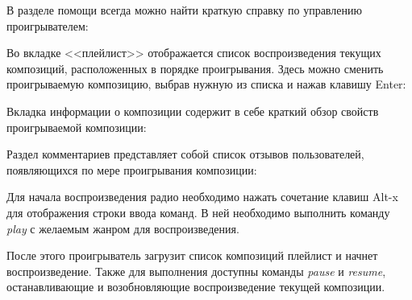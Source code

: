 
В разделе помощи всегда можно найти краткую справку по управлению
проигрывателем: 


\newpage

Во вкладке <<плейлист>> отображается список воспроизведения текущих
композиций, расположенных в порядке проигрывания. Здесь можно сменить
проигрываемую композицию, выбрав нужную из списка и нажав клавишу
Enter:


Вкладка информации о композиции содержит в себе краткий обзор свойств
проигрываемой композиции:


Раздел комментариев представляет собой список отзывов пользователей,
появляющихся по мере проигрывания композиции: 


Для начала воспроизведения радио необходимо нажать сочетание клавиш
Alt-x для отображения строки ввода команд. В ней необходимо выполнить
команду \textit{play} с желаемым жанром для воспроизведения.


После этого проигрыватель загрузит список композиций плейлист и начнет
воспроизведение. Также для выполнения доступны команды \textit{pause}
и \textit{resume}, останавливающие и возобновляющие воспроизведение
текущей композиции.

